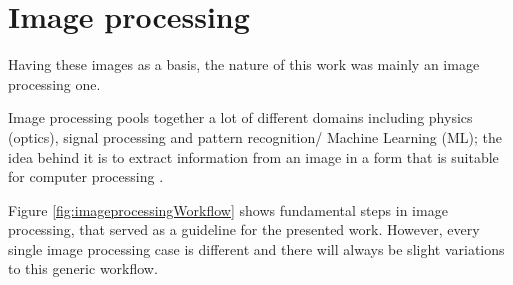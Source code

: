 \section{Image processing}

Having these images as a basis, the nature of this work was mainly an image processing one.

Image processing pools together a lot of different domains including physics (optics), signal processing and pattern recognition/ Machine Learning (ML); %
the idea behind it is to extract information from an image in a form that is suitable for computer processing \cite{pydata2018}. 

Figure \ref{fig:imageprocessingWorkflow} shows fundamental steps in image processing, that served as a guideline for the presented work. However, every single image processing case is different and there will always be slight variations to this generic %
workflow.




